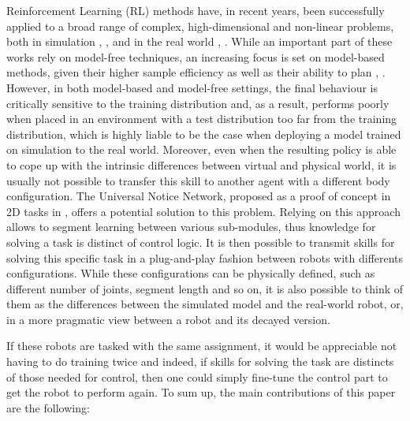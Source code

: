 \documentclass[letterpaper, 10 pt, conference]{ieeeconf}  %
\begin{document}
Reinforcement Learning (RL) methods have, in recent years, been successfully applied to a broad range of complex, high-dimensional and non-linear problems, both in simulation \cite{AtariOneShort}, \cite{PPOAcrobatics}, and in the real world \cite{OpenAIDextrousShort}, \cite{AlphaGOShort}. While an important part of these works rely on model-free techniques, an increasing focus is set on model-based methods, given their higher sample efficiency 
as well as their ability to plan \cite{WorldModels}, \cite{PlanningChelsea}. However, in both model-based and model-free settings, the final behaviour is critically sensitive to the training distribution and, as a result, performs poorly when placed in an environment with a test distribution too far from the training distribution, which is highly liable to be the case when deploying a model trained on simulation to the real world. Moreover, even when the resulting policy is able to cope up with the intrinsic differences between virtual and physical world, it is usually not possible to transfer this skill to another agent with a different body configuration. The Universal Notice Network, proposed as a proof of concept in 2D tasks in \cite{UNN}, offers a potential solution to this problem. Relying on this approach allows to segment learning between various sub-modules, thus knowledge for solving a task is distinct of control logic. It is then possible to transmit skills for solving this specific task in a plug-and-play fashion between robots with differents configurations. While these configurations can be physically defined, such as different number of joints, segment length and so on, it is also possible to think of them as the differences between the simulated model and the real-world robot, or, in a more pragmatic view between a robot and its decayed version. 

If these robots are tasked with the same assignment, it would be appreciable not having to do training twice and indeed, if skills for solving the task are distincts of those needed for control, then one could simply fine-tune the control part to get the robot to perform again. To sum up, the main contributions of this paper are the following: 
\end{document}
